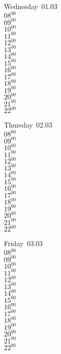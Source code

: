 \documentclass[11pt,a4paper]{book}\usepackage[]{graphicx}\usepackage[]{color}
\begin{document}
\begin{weekdaybox}
  Wednesday~01.03\\
  { 
  \vfill
  $08^{00}$\\
$09^{00}$\\
$10^{00}$\\
$11^{00}$\\
$12^{00}$\\
$13^{00}$\\
$14^{00}$\\
$15^{00}$\\
$16^{00}$\\
$17^{00}$\\
$18^{00}$\\
$19^{00}$\\
$20^{00}$\\
$21^{00}$\\
$22^{00}$\\
  }
\end{weekdaybox}
\clearpage
\begin{headerbox}
\end{headerbox}
\begin{weekdaybox}
  Thursday~02.03\\
  { 
  \vfill
  $08^{00}$\\
$09^{00}$\\
$10^{00}$\\
$11^{00}$\\
$12^{00}$\\
$13^{00}$\\
$14^{00}$\\
$15^{00}$\\
$16^{00}$\\
$17^{00}$\\
$18^{00}$\\
$19^{00}$\\
$20^{00}$\\
$21^{00}$\\
$22^{00}$\\
  }
\end{weekdaybox} 
\begin{weekdaybox}
  Friday~03.03\\
  { 
  \vfill
  $08^{00}$\\
$09^{00}$\\
$10^{00}$\\
$11^{00}$\\
$12^{00}$\\
$13^{00}$\\
$14^{00}$\\
$15^{00}$\\
$16^{00}$\\
$17^{00}$\\
$18^{00}$\\
$19^{00}$\\
$20^{00}$\\
$21^{00}$\\
$22^{00}$\\
  }
\end{weekdaybox}
\end{document}

